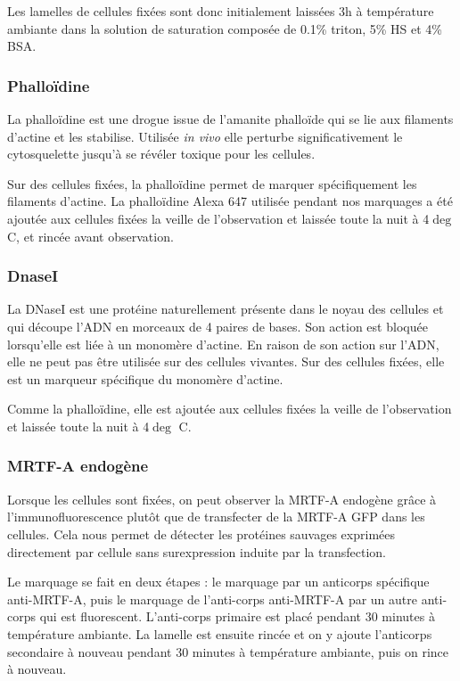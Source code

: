 \documentclass{report}
\begin{document}
		Les lamelles de cellules fixées sont donc initialement laissées 3h à température ambiante dans la solution de saturation composée de 0.1\% triton, 5\% HS et 4\% BSA. 
		
		\subsubsection{Phalloïdine}
		La phalloïdine est une drogue issue de l'amanite phalloïde qui se lie aux filaments d'actine et les stabilise. Utilisée \emph{in vivo} elle perturbe significativement le cytosquelette jusqu'à se révéler toxique pour les cellules. 
		
		Sur des cellules fixées, la phalloïdine permet de marquer spécifiquement les filaments d'actine. La phalloïdine Alexa 647 utilisée pendant nos marquages a été ajoutée aux cellules fixées la veille de l'observation et laissée toute la nuit à 4$\deg$ C, et rincée avant observation. 
		\subsubsection{DnaseI}
		La DNaseI est une protéine naturellement présente dans le noyau des cellules et qui découpe l'ADN en morceaux de 4 paires de bases. Son action est bloquée lorsqu'elle est liée à un monomère d'actine. En raison de son action sur l'ADN, elle ne peut pas être utilisée sur des cellules vivantes. Sur des cellules fixées, elle est un marqueur spécifique du monomère d'actine. 
		
		Comme la phalloïdine, elle est ajoutée aux cellules fixées la veille de l'observation et laissée toute la nuit à 4$\deg$ C. 
		\subsubsection{MRTF-A endogène}
		
		Lorsque les cellules sont fixées, on peut observer la MRTF-A endogène grâce à l'immunofluorescence plutôt que de transfecter de la MRTF-A GFP dans les cellules. Cela nous permet de détecter les protéines sauvages exprimées directement par cellule sans surexpression induite par la transfection. 
		
		Le marquage se fait en deux étapes : le marquage par un anticorps spécifique anti-MRTF-A, puis le marquage de l'anti-corps anti-MRTF-A par un autre anti-corps qui est fluorescent. L'anti-corps primaire est placé pendant 30 minutes à température ambiante. La lamelle est ensuite rincée et on y ajoute l'anticorps secondaire à nouveau pendant 30 minutes à température ambiante, puis on rince à nouveau. 
		 
\end{document}

